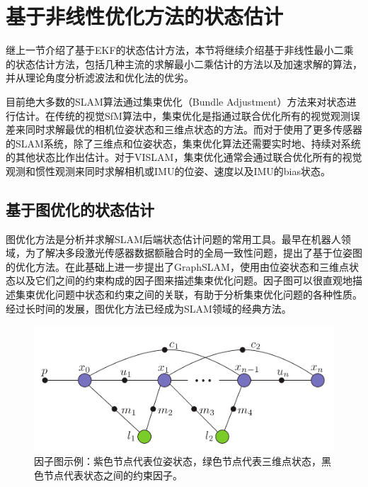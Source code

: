 \section{基于非线性优化方法的状态估计}

继上一节介绍了基于EKF的状态估计方法，本节将继续介绍基于非线性最小二乘的状态估计方法，包括几种主流的求解最小二乘估计的方法以及加速求解的算法，并从理论角度分析滤波法和优化法的优劣。

目前绝大多数的SLAM算法通过集束优化\citep{triggs1999bundle}（Bundle Adjustment）方法来对状态进行估计。在传统的视觉SfM算法中，集束优化是指通过联合优化所有的视觉观测误差来同时求解最优的相机位姿状态和三维点状态的方法。而对于使用了更多传感器的SLAM系统，除了三维点和位姿状态，集束优化算法还需要实时地、持续对系统的其他状态比作出估计。对于VISLAM，集束优化通常会通过联合优化所有的视觉观测和惯性观测来同时求解相机或IMU的位姿、速度以及IMU的bias状态。

\subsection{基于图优化的状态估计}

图优化方法是分析并求解SLAM后端状态估计问题的常用工具。最早在机器人领域，为了解决多段激光传感器数据额融合时的全局一致性问题，\citep{lu1997globally,lu1997robot}提出了基于位姿图的优化方法。\citep{thrun2006graph}在此基础上进一步提出了GraphSLAM，使用由位姿状态和三维点状态以及它们之间的约束构成的因子图来描述集束优化问题。因子图可以很直观地描述集束优化问题中状态和约束之间的关联，有助于分析集束优化问题的各种性质。经过长时间的发展，图优化方法已经成为SLAM领域的经典方法。

\begin{figure}[htb!]
    \centering
    \includegraphics[width=.6\textwidth]{figs/isam_factor_graph.png}
    \caption{因子图示例\citep{kaess2012isam2}：紫色节点代表位姿状态，绿色节点代表三维点状态，黑色节点代表状态之间的约束因子。}
    \label{fig:isam_factor_graph}
\end{figure}

